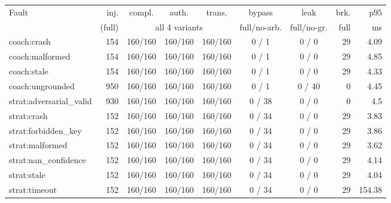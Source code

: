 \begin{tabular}{lrcccccrr}
\toprule
Fault & inj. & compl. & auth. & trans. & bypass & leak & brk. & p95\\
 & (full) & \multicolumn{3}{c}{all 4 variants} & full/no-arb. & full/no-gr. & full & ms\\
\midrule
coach:crash & 154 & 160/160 & 160/160 & 160/160 & 0 / 1 & 0 / 0 & 29 & 4.09 \\
coach:malformed & 154 & 160/160 & 160/160 & 160/160 & 0 / 1 & 0 / 0 & 29 & 4.85 \\
coach:stale & 154 & 160/160 & 160/160 & 160/160 & 0 / 1 & 0 / 0 & 29 & 4.33 \\
coach:ungrounded & 950 & 160/160 & 160/160 & 160/160 & 0 / 1 & 0 / 40 & 0 & 4.45 \\
strat:adversarial\_valid & 930 & 160/160 & 160/160 & 160/160 & 0 / 38 & 0 / 0 & 0 & 4.5 \\
strat:crash & 152 & 160/160 & 160/160 & 160/160 & 0 / 34 & 0 / 0 & 29 & 3.83 \\
strat:forbidden\_key & 152 & 160/160 & 160/160 & 160/160 & 0 / 34 & 0 / 0 & 29 & 3.86 \\
strat:malformed & 152 & 160/160 & 160/160 & 160/160 & 0 / 34 & 0 / 0 & 29 & 3.62 \\
strat:nan\_confidence & 152 & 160/160 & 160/160 & 160/160 & 0 / 34 & 0 / 0 & 29 & 4.14 \\
strat:stale & 152 & 160/160 & 160/160 & 160/160 & 0 / 34 & 0 / 0 & 29 & 4.04 \\
strat:timeout & 152 & 160/160 & 160/160 & 160/160 & 0 / 34 & 0 / 0 & 29 & 154.38 \\
\bottomrule
\end{tabular}
